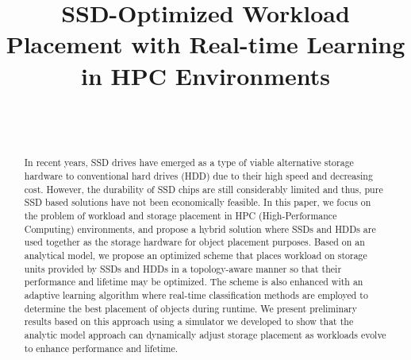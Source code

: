 \documentclass[conference]{IEEEtran}
\begin{document}

\title{SSD-Optimized Workload Placement with Real-time Learning in HPC Environments}
\author{\\
\vspace{-0.1in}
 \\
\vspace{-0.1in}
}

\vspace{-0.4in}
\maketitle


\vspace{-1in}
\begin{abstract}
In recent years, SSD drives have emerged as a type of viable alternative storage hardware to conventional hard drives (HDD) due to their high speed and decreasing cost. However, the durability of SSD chips are still considerably limited and thus, pure SSD based solutions have not been economically feasible. In this paper, we focus on the problem of workload and storage placement in HPC (High-Performance Computing) environments, and propose
a hybrid solution where SSDs and HDDs are used together as the storage hardware for object placement purposes. Based on an analytical model, we propose an optimized scheme that places workload on storage units provided by SSDs and HDDs in a topology-aware manner so that their performance and lifetime may be optimized. The scheme is also enhanced with an adaptive learning algorithm where real-time classification methods are employed to determine the best placement of objects during runtime. We present preliminary results based on this approach using a simulator we developed to show that the analytic model approach can dynamically adjust storage placement as workloads evolve to enhance performance and lifetime.


\end{abstract}






%

%


{\small
\nocite{*}


}
\end{document}
